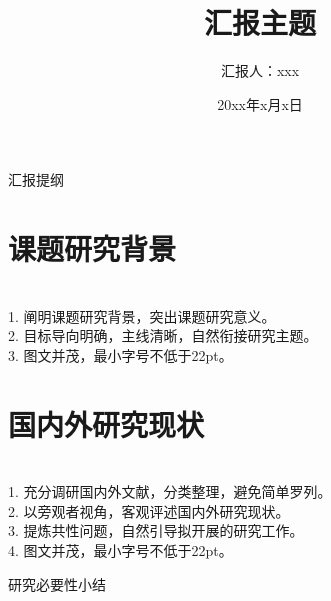 \documentclass[10pt,aspectratio=169]{beamer}
\title[汇报主题]{汇报主题}
\author{汇报人：xxx}
\institute{华中科技大学高压大功率特种电源研究组}
\date{20xx年x月x日}
\begin{document}
\HUSTTitleFrame

\begin{frame}{汇报提纲}
  \HUSTOutline
\end{frame}

\section{课题研究背景}
\begin{frame}
\begin{HUSTRequirementFrame}
\\
1. \quad 阐明课题研究背景，突出课题研究意义。\\
2. \quad 目标导向明确，主线清晰，自然衔接研究主题。\\
3. \quad 图文并茂，最小字号不低于22pt。
\end{HUSTRequirementFrame}
\end{frame}

\section{国内外研究现状}
\begin{frame}
\begin{refsegment}
\begin{HUSTRequirementFrame}
\\
1. \quad 充分调研国内外文献，分类整理，避免简单罗列。\\
2. \quad 以旁观者视角，客观评述国内外研究现状。\\
3. \quad 提炼共性问题，自然引导拟开展的研究工作。\\
4. \quad 图文并茂，最小字号不低于22pt。
\end{HUSTRequirementFrame}
\HUSTFrameReferences
\end{refsegment}
\end{frame}

\begin{frame}{研究必要性小结}
\begin{HUSTRequirementFrame}[compact]
\\[.18in]
\\[.18in]
\\[.18in]
\end{HUSTRequirementFrame}
\end{frame}
\end{document}
